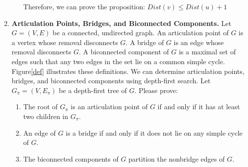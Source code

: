 \documentclass[12pt,a4paper]{article}
\theoremstyle{definition}
\begin{document}
\begin{enumerate}
\begin{enumerate}
 	Therefore, we can prove the proposition: $Dist(v)\leq Dist(u)+1$
 	
 	 	
  	
   \end{enumerate}



    \item 
    \textbf{Articulation Points, Bridges, and Biconnected Components.} Let $G=(V, E)$ be a connected, undirected graph. An articulation point of $G$ is a vertex whose removal disconnects $G$. A bridge of $G$ is an edge whose removal disconnects $G .$ A biconnected component of $G$ is a maximal set of edges such that any two edges in the set lie on a common simple cycle. Figure\ref{def} illustrates these definitions. We can determine articulation points, bridges, and biconnected components using depth-first search. Let $G_{\pi}=\left(V, E_{\pi}\right)$ be a depth-first tree of $G$. Please prove:
    
       
    \begin{enumerate}
    	\item The root of $G_{\pi}$ is an articulation point of $G$ if and only if it has at least two children in $G_{\pi}$.
    	\item An edge of $G$ is a bridge if and only if it does not lie on any simple cycle of $G$.
    	\item The biconnected components of $G$ partition the nonbridge edges of $G$.
    \end{enumerate}

 \begin{figure}[htbp]
	

\end{figure}
\end{enumerate}
\end{document}
